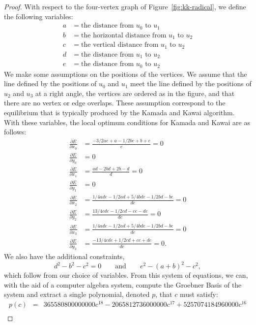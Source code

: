 \documentclass[oribibl,10pt]{llncs}
\begin{document}
\begin{appendix}
\begin{proof}
With respect to the four-vertex graph of Figure~\ref{fig:kk-radical},
we define the following variables:
\begin{align*}
a &=\text{the distance from $u_0$ to $u_1$}\\
b &=\text{the horizontal distance from $u_1$ to $u_2$}\\
c &=\text{the vertical distance from $u_1$ to $u_2$}\\
d &=\text{the distance from $u_1$ to $u_2$}\\
e &=\text{the distance from $u_0$ to $u_2$}
\end{align*}
We make some assumptions on the positions of the vertices. We assume that the line defined by the positions of $u_0$ and $u_1$ meet the line defined by the positions of $u_2$ and $u_3$ at a right angle, the vertices are ordered as in the figure, and that there are no vertex or edge overlaps. These assumption correspond to the equilibrium that is typically produced by the Kamada and Kawai algorithm.
With these variables, the local optimum conditions for Kamada and Kawai are
as follows:
\begin{align*}
\frac{\partial E}{\partial x_0} &= \frac{-3/2ae + a - 1/2be + b + e}{e} =0\\
\frac{\partial E}{\partial y_0} &= 0\\
\frac{\partial E}{\partial x_1} &= \frac{ad - 2bd + 2b - d}{d} =0\\
\frac{\partial E}{\partial y_1} &= 0\\
\frac{\partial E}{\partial x_2} &= \frac{1/4ade - 1/2ad + 5/4bde - 1/2bd - be}{de} =0\\
\frac{\partial E}{\partial y_2} &= \frac{13/4cde - 1/2cd - ce - de}{de} =0\\
\frac{\partial E}{\partial x_3} &= \frac{1/4ade - 1/2ad + 5/4bde - 1/2bd - be}{de} =0\\
\frac{\partial E}{\partial y_3} &= \frac{-13/4cde + 1/2cd + ce + de}{de} = 0.
\end{align*}
We also have the additional constraints,
\[
d^2 - b^2 - c^2 = 0 \quad\quad\text{and}\quad\quad e^2 - (a+b)^2 - c^2,
\]
which follow from our choice of variables. From this system of equations, we can, with the aid of a computer algebra system, compute the Groebner Basis of the system and extract a single polynomial, denoted $p$, that $c$ must satisfy:
\begin{eqnarray*}
p(c) &=& 365580800000000c^{18}
- 2065812736000000c^{17}
+ 5257074184960000c^{16}\\

\end{eqnarray*}
\end{proof}
\end{appendix}
\end{document}
